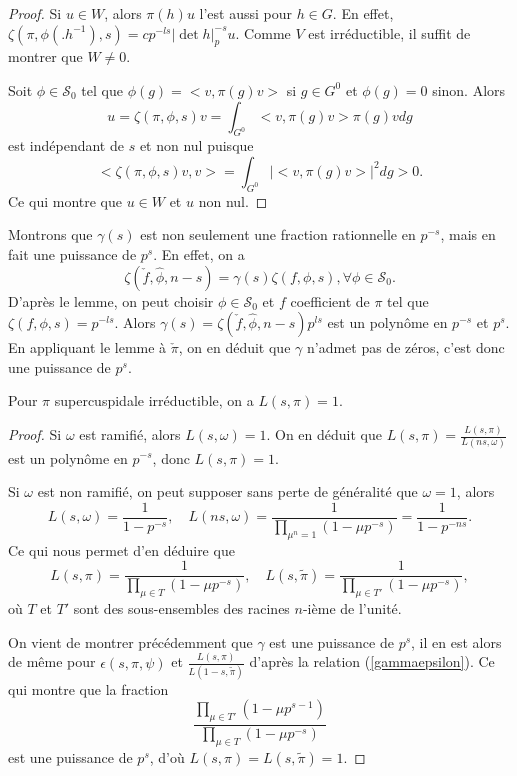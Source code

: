 \begin{proof}
Si $u \in W$, alors $\pi(h)u$ l'est aussi pour $h \in G$. En effet,
$\zeta(\pi,\phi(.h^{-1}),s) = cp^{-ls}|\det h|_p^{-s}u$. Comme $V$ est irréductible, il suffit de montrer que $W \neq 0$.

Soit $\phi \in \mathcal{S}_0$ tel que $\phi(g) = <v, \pi(g)v>$ si $g \in G^0$ et $\phi(g) = 0$ sinon. Alors
\begin{equation}
u=\zeta(\pi, \phi, s)v = \int_{G^0} <v,\pi(g)v>\pi(g)v dg
\end{equation}
est indépendant de $s$ et non nul puisque
\begin{equation}
<\zeta(\pi,\phi,s)v,v> = \int_{G^0} |<v,\pi(g)v>|^2 dg > 0.
\end{equation}
Ce qui montre que $u \in W$ et $u$ non nul.
\end{proof}

Montrons que $\gamma(s)$ est non seulement une fraction rationnelle en $p^{-s}$, mais en fait une puissance de $p^s$. En effet, on a
\begin{equation}
\zeta(\check{f}, \hat{\phi}, n-s)=\gamma(s)\zeta(f,\phi,s), \forall \phi \in \mathcal{S}_0.
\end{equation}
D'après le lemme, on peut choisir $\phi \in \mathcal{S}_0$ et $f$ coefficient de $\pi$ tel que $\zeta(f,\phi,s)=p^{-ls}$. Alors $\gamma(s) = \zeta(\check{f}, \hat{\phi}, n-s)p^{ls}$ est un polynôme en $p^{-s}$ et $p^s$. En appliquant le lemme à $\check{\pi}$, on en déduit que $\gamma$ n'admet pas de zéros, c'est donc une puissance de $p^{s}$.

\begin{proposition}
Pour $\pi$ supercuspidale irréductible, on a $L(s,\pi)=1$.
\end{proposition}

\begin{proof}
Si $\omega$ est ramifié, alors $L(s,\omega)=1$. On en déduit que
$L(s,\pi)=\frac{L(s,\pi)}{L(ns,\omega)}$ est un polynôme en $p^{-s}$, donc $L(s, \pi)=1$.

Si $\omega$ est non ramifié, on peut supposer sans perte de généralité que $\omega=1$, alors
\begin{equation}
L(s,\omega)=\frac{1}{1-p^{-s}}, \quad L(ns,\omega)=\frac{1}{\prod_{\mu^n=1}(1-\mu p^{-s})}=\frac{1}{1-p^{-ns}}.
\end{equation}
Ce qui nous permet d'en déduire que
\begin{equation}
L(s,\pi) = \frac{1}{\prod_{\mu \in T}(1-\mu p^{-s})}, \quad L(s,\tilde{\pi}) = \frac{1}{\prod_{\mu \in T'}(1-\mu p^{-s})},
\end{equation}
où $T$ et $T'$ sont des sous-ensembles des racines $n$-ième de l'unité.

On vient de montrer précédemment que $\gamma$ est une puissance de $p^s$, il en est alors de même pour $\epsilon(s,\pi,\psi)$ et $\frac{L(s,\pi)}{L(1-s,\tilde{\pi})}$ d'après la relation (\ref{gammaepsilon}). Ce qui montre que la fraction
\begin{equation}
\frac{\prod_{\mu \in T'}(1-\mu p^{s-1})}{\prod_{\mu \in T}(1-\mu p^{-s})}
\end{equation}
est une puissance de $p^s$, d'où $L(s,\pi)=L(s,\tilde{\pi})=1$.
\end{proof}